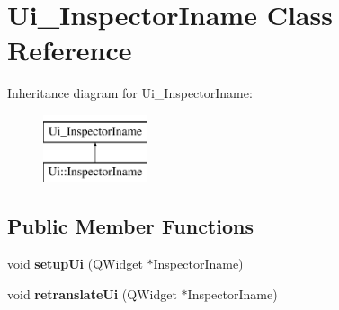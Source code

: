 \hypertarget{class_ui___inspector_iname}{}\section{Ui\+\_\+\+Inspector\+Iname Class Reference}
\label{class_ui___inspector_iname}
Inheritance diagram for Ui\+\_\+\+Inspector\+Iname\+:\begin{figure}[H]
\begin{center}
\leavevmode
\includegraphics[height=2.000000cm]{class_ui___inspector_iname}
\end{center}
\end{figure}
\subsection*{Public Member Functions}
\begin{DoxyCompactItemize}
\item 
\mbox{\label{class_ui___inspector_iname_ac076c4c350f541e106a200cae553965c}} 
void {\bfseries setup\+Ui} (Q\+Widget $\ast$Inspector\+Iname)
\item 
\mbox{\label{class_ui___inspector_iname_a8b632587d2e9b4da5bd8250d68076ea3}} 
void {\bfseries retranslate\+Ui} (Q\+Widget $\ast$Inspector\+Iname)
\end{DoxyCompactItemize}
